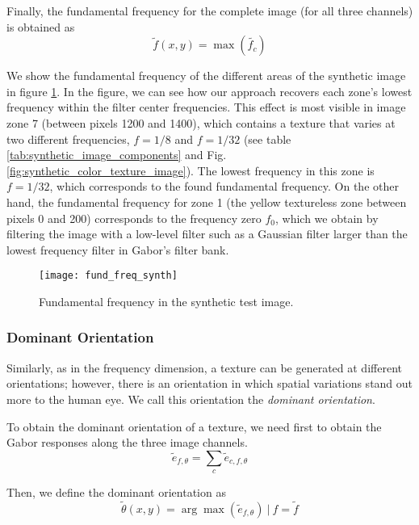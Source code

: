 Finally, the fundamental frequency for the complete image (for all three channels) is obtained as
\begin{equation}
	\widetilde{f}(x,y) =  \max(\widetilde{f_c})  \label{eq:fundamental_freq}
\end{equation}

We show the fundamental frequency of the different areas of the synthetic image in figure \ref{fig:fund_freq_synth}. In the figure, we can see how our approach recovers each zone's lowest frequency within the filter center frequencies. This effect is most visible in image zone 7 (between pixels 1200 and 1400), which contains a texture that varies at two different frequencies, $f = 1/8$ and $f = 1/32$ (see table \ref{tab:synthetic_image_components} and Fig. \ref{fig:synthetic_color_texture_image}). The lowest frequency in this zone is $f = 1/32$, which corresponds to the found fundamental frequency. On the other hand, the fundamental frequency for zone 1 (the yellow textureless zone between pixels 0 and 200) corresponds to the frequency zero $f_0$, which we obtain by filtering the image with a low-level filter such as a Gaussian filter larger than the lowest frequency filter in Gabor's filter bank.

\begin{figure}[!ht]
	\texttt{[image: fund\_freq\_synth]}
    \caption{Fundamental frequency in the synthetic test image.}
    \label{fig:fund_freq_synth}
\end{figure}

\subsubsection{Dominant Orientation}
Similarly, as in the frequency dimension, a texture can be generated at different orientations; however, there is an orientation in which spatial variations stand out more to the human eye. We call this orientation the \textit{dominant orientation}.

To obtain the dominant orientation of a texture, we need first to obtain the Gabor responses along the three image channels.
\begin{equation}
	\widetilde{e}_{f, \theta} = \underset{c}{\sum} \widetilde{e}_{c, f, \theta}  \label{eq:gabor_energy_freq_orient}
\end{equation}

Then, we define the dominant orientation as 
\begin{equation}
	\widetilde{\theta}(x,y) =  \arg\max (\widetilde{e}_{f, \theta}) ~|~ f = \widetilde{f} \label{eq:dominant_orient}
\end{equation}

